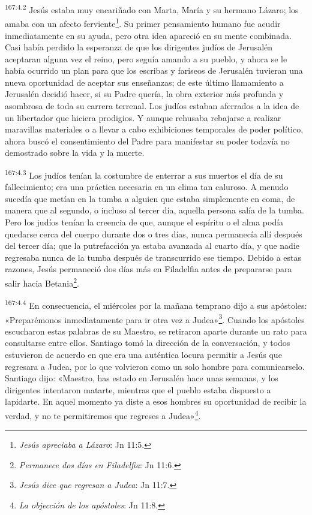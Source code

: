 \par
\textsuperscript{167:4.2} Jesús estaba muy encariñado con Marta, María y su hermano Lázaro; los amaba con un afecto ferviente\footnote{\textit{Jesús apreciaba a Lázaro}: Jn 11:5.}. Su primer pensamiento humano fue acudir inmediatamente en su ayuda, pero otra idea apareció en su mente combinada. Casi había perdido la esperanza de que los dirigentes judíos de Jerusalén aceptaran alguna vez el reino, pero seguía amando a su pueblo, y ahora se le había ocurrido un plan para que los escribas y fariseos de Jerusalén tuvieran una nueva oportunidad de aceptar sus enseñanzas; de este último llamamiento a Jerusalén decidió hacer, si su Padre quería, la obra exterior más profunda y asombrosa de toda su carrera terrenal. Los judíos estaban aferrados a la idea de un libertador que hiciera prodigios. Y aunque rehusaba rebajarse a realizar maravillas materiales o a llevar a cabo exhibiciones temporales de poder político, ahora buscó el consentimiento del Padre para manifestar su poder todavía no demostrado sobre la vida y la muerte.

\par
\textsuperscript{167:4.3} Los judíos tenían la costumbre de enterrar a sus muertos el día de su fallecimiento; era una práctica necesaria en un clima tan caluroso. A menudo sucedía que metían en la tumba a alguien que estaba simplemente en coma, de manera que al segundo, o incluso al tercer día, aquella persona salía de la tumba. Pero los judíos tenían la creencia de que, aunque el espíritu o el alma podía quedarse cerca del cuerpo durante dos o tres días, nunca permanecía allí después del tercer día; que la putrefacción ya estaba avanzada al cuarto día, y que nadie regresaba nunca de la tumba después de transcurrido ese tiempo. Debido a estas razones, Jesús permaneció dos días más en Filadelfia antes de prepararse para salir hacia Betania\footnote{\textit{Permanece dos días en Filadelfia}: Jn 11:6.}.

\par
\textsuperscript{167:4.4} En consecuencia, el miércoles por la mañana temprano dijo a sus apóstoles: «Preparémonos inmediatamente para ir otra vez a Judea»\footnote{\textit{Jesús dice que regresan a Judea}: Jn 11:7.}. Cuando los apóstoles escucharon estas palabras de su Maestro, se retiraron aparte durante un rato para consultarse entre ellos. Santiago tomó la dirección de la conversación, y todos estuvieron de acuerdo en que era una auténtica locura permitir a Jesús que regresara a Judea, por lo que volvieron como un solo hombre para comunicarselo. Santiago dijo: «Maestro, has estado en Jerusalén hace unas semanas, y los dirigentes intentaron matarte, mientras que el pueblo estaba dispuesto a lapidarte. En aquel momento ya diste a esos hombres su oportunidad de recibir la verdad, y no te permitiremos que regreses a Judea»\footnote{\textit{La objección de los apóstoles}: Jn 11:8.}.

